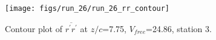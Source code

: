 \begin{figure}[H]
\centering
\texttt{[image: figs/run\_26/run\_26\_rr\_contour]}
\caption{Contour plot of $\overline{r^\prime r^\prime}$ at $z/c$=7.75, $V_{free}$=24.86, station 3.}
\label{fig:run_26_rr_contour}
\end{figure}


